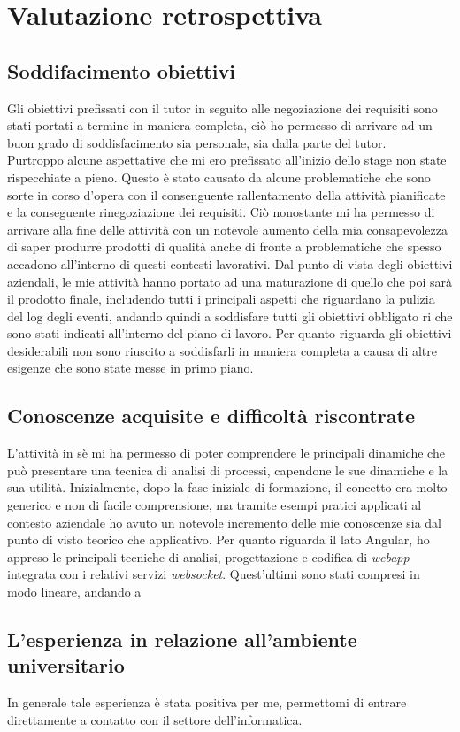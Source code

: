 
\chapter{Valutazione retrospettiva}
\label{cap:analisi-requisiti}


\section{Soddifacimento obiettivi}
Gli obiettivi prefissati con il tutor in seguito alle negoziazione dei requisiti sono stati portati a termine in maniera completa, ciò ho permesso di arrivare ad un buon grado di soddisfacimento sia personale, sia dalla parte del tutor.\\
Purtroppo alcune aspettative che mi ero prefissato all'inizio dello stage non state rispecchiate a pieno. Questo è stato causato da alcune problematiche che sono sorte in corso d'opera con il consenguente rallentamento della attività pianificate e la conseguente rinegoziazione dei requisiti. Ciò nonostante mi ha permesso di arrivare alla fine delle attività con un notevole aumento della mia consapevolezza di saper produrre prodotti di qualità anche di fronte a problematiche che spesso accadono all'interno di questi contesti lavorativi. Dal punto di vista degli obiettivi aziendali, le mie attività hanno portato ad una maturazione di quello che poi sarà il prodotto finale, includendo tutti i principali aspetti che riguardano la pulizia del log degli eventi, andando quindi a soddisfare tutti gli obiettivi obbligato ri che sono stati indicati all'interno del piano di lavoro. Per quanto riguarda gli obiettivi desiderabili non sono riuscito a soddisfarli in maniera completa a causa di altre esigenze che sono state messe in primo piano. 
\section{Conoscenze acquisite e difficoltà riscontrate}
L'attività in sè mi ha permesso di poter comprendere le principali dinamiche che può presentare una tecnica di analisi di processi, capendone le sue dinamiche e la sua utilità. Inizialmente, dopo la fase iniziale di formazione, il concetto era molto generico e non di facile comprensione, ma tramite esempi pratici applicati al contesto aziendale ho avuto un notevole incremento delle mie conoscenze sia dal punto di visto teorico che applicativo. Per quanto riguarda il lato Angular, ho appreso le principali tecniche di analisi, progettazione e codifica di \textit{webapp} integrata con i relativi servizi \textit{websocket}. Quest'ultimi sono stati compresi in modo lineare, andando a 

\section{L'esperienza in relazione all'ambiente universitario}
In generale tale esperienza è stata positiva per me, permettomi di entrare direttamente a contatto con il settore dell'informatica. 